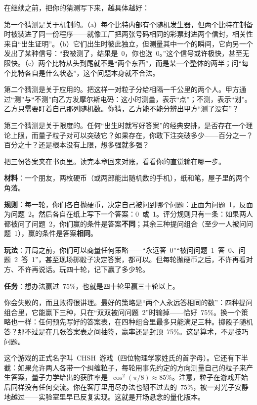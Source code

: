 
在继续之前，把你的猜测写下来，越具体越好：

第一个猜测是关于机制的。（a）每个比特内部有个随机发生器，但两个比特在制备时被装进了同一份程序——就像工厂把两张号码相同的彩票封进两个信封，相关性来自“出生证明”。（b）它们出生时彼此独立，但测量其中一个的瞬间，它向另一个发出了某种信号：“我被测了，结果是~0，你也选~0。”这个信号或许极快，甚至无限快。（c）两个比特从头到尾就不是“两个东西”，而是某一个整体的两半；问“每个比特各自是什么状态”，这个问题本身就不合法。

第二个猜测是关于应用的。把这样一对粒子分给相隔一千公里的两个人。甲方通过“测”与“不测”向乙方发摩尔斯电码：这小时测量，表示“点”；不测，表示“划”。乙方只需要盯着自己那列随机数。你猜，乙方能不能分辨出甲方“测了没有”？

第三个猜测是关于限度的。任何“出生时就写好答案”的经典安排，是否存在一个理论上限，而量子粒子对可以突破它？如果存在，你敢下注突破多少——百分之一？百分之十？还是根本没有上限，想多强就多强？

把三份答案夹在书页里。读完本章回来对账，看看你的直觉输在哪一步。


\begin{experiment}
\textbf{材料}：一个朋友，两枚硬币（或两部能出随机数的手机），纸和笔，屋子里的两个角落。

\textbf{规则}：每一轮，你们各自抛硬币，决定自己被问到哪个问题：正面为问题~1，反面为问题~2。然后各自在纸上写下一个答案：0~或~1。评分规则只有一条：如果两人都被问了问题~2，你们赢的条件是答案\textbf{不同}；其余三种提问组合（至少一人被问问题~1），赢的条件是答案\textbf{相同}。

\textbf{玩法}：开局之前，你们可以商量任何策略——“永远答~0”“被问问题~1~答~0、问题~2~答~1”，甚至现场掷骰子决定答案，都可以。但每轮抛硬币之后，不许再看对方、不许再说话。玩四十轮，记下赢了多少轮。

\textbf{任务}：想办法赢过~75\%，也就是四十轮里赢三十轮以上。
\end{experiment}

你会失败的，而且败得很讲理。最好的策略是“两个人永远答相同的数”：四种提问组合里，它能赢下三种，只在“双双被问问题~2”时输掉——恰好~75\%。换一个策略也一样：任何预先写好的答案表，在四种组合里最多只能满足三种。掷骰子随机答？那不过是在几张答案表之间抽签，赢率还是封顶~75\%。这是算术，不是技巧问题。

这个游戏的正式名字叫~CHSH~游戏（四位物理学家姓氏的首字母）。它还有下半截：如果允许两人各带一个纠缠粒子，每轮用事先约定的方向测量自己的粒子来产生答案，量子力学给出的获胜率是~\(\cos^2(\pi/8)\approx85\%\)。注意，粒子在游戏开始后同样没有任何交流。你在客厅里用尽办法也翻不过去的~75\%，被一对光子安静地越过——实验室里早已反复实现。这就是开场悬念的量化版本。

